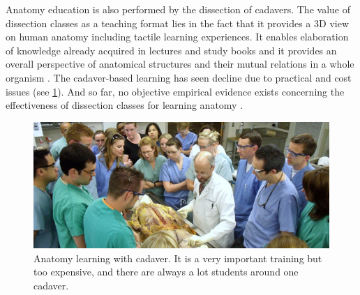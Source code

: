 Anatomy education is also performed by the dissection of cadavers.  The value of dissection classes as a teaching format lies in the fact that it provides a 3D view on human anatomy including tactile learning experiences. It enables elaboration of knowledge already acquired in lectures and study books and it provides an overall perspective of anatomical structures and their mutual relations in a whole organism \cite{McLachlan2004}. 
The cadaver-based learning has seen decline due to practical and cost issues (see \figurename{\ref{fig:2-bg:cadaver}}). And so far, no objective empirical evidence exists concerning the effectiveness of dissection classes for learning anatomy \cite{Frank2005}.
\begin{figure}
	\centering
	\includegraphics[width=0.8\linewidth]{figures/2-bg/cadaver}
	\caption{Anatomy learning with cadaver. It is a very important training but too expensive, and there are always a lot students around one cadaver.}
	\label{fig:2-bg:cadaver}
\end{figure}

